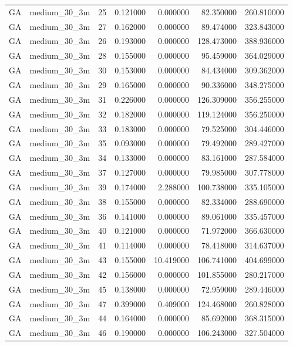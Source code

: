 \begin{tabular}{llrrrrr}
GA & medium_30_3m & 25 & 0.121000 & 0.000000 & 82.350000 & 260.810000 \\
GA & medium_30_3m & 27 & 0.162000 & 0.000000 & 89.474000 & 323.843000 \\
GA & medium_30_3m & 26 & 0.193000 & 0.000000 & 128.473000 & 388.936000 \\
GA & medium_30_3m & 28 & 0.155000 & 0.000000 & 95.459000 & 364.029000 \\
GA & medium_30_3m & 30 & 0.153000 & 0.000000 & 84.434000 & 309.362000 \\
GA & medium_30_3m & 29 & 0.165000 & 0.000000 & 90.336000 & 348.275000 \\
GA & medium_30_3m & 31 & 0.226000 & 0.000000 & 126.309000 & 356.255000 \\
GA & medium_30_3m & 32 & 0.182000 & 0.000000 & 119.124000 & 356.250000 \\
GA & medium_30_3m & 33 & 0.183000 & 0.000000 & 79.525000 & 304.446000 \\
GA & medium_30_3m & 35 & 0.093000 & 0.000000 & 79.492000 & 289.427000 \\
GA & medium_30_3m & 34 & 0.133000 & 0.000000 & 83.161000 & 287.584000 \\
GA & medium_30_3m & 37 & 0.127000 & 0.000000 & 79.985000 & 307.778000 \\
GA & medium_30_3m & 39 & 0.174000 & 2.288000 & 100.738000 & 335.105000 \\
GA & medium_30_3m & 38 & 0.155000 & 0.000000 & 82.334000 & 288.690000 \\
GA & medium_30_3m & 36 & 0.141000 & 0.000000 & 89.061000 & 335.457000 \\
GA & medium_30_3m & 40 & 0.121000 & 0.000000 & 71.972000 & 366.630000 \\
GA & medium_30_3m & 41 & 0.114000 & 0.000000 & 78.418000 & 314.637000 \\
GA & medium_30_3m & 43 & 0.155000 & 10.419000 & 106.741000 & 404.699000 \\
GA & medium_30_3m & 42 & 0.156000 & 0.000000 & 101.855000 & 280.217000 \\
GA & medium_30_3m & 45 & 0.138000 & 0.000000 & 72.959000 & 289.446000 \\
GA & medium_30_3m & 47 & 0.399000 & 0.409000 & 124.468000 & 260.828000 \\
GA & medium_30_3m & 44 & 0.164000 & 0.000000 & 85.692000 & 368.315000 \\
GA & medium_30_3m & 46 & 0.190000 & 0.000000 & 106.243000 & 327.504000 \\

\end{tabular}
